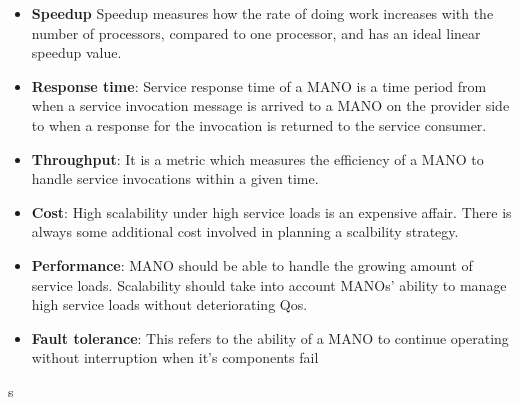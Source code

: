 \begin{itemize}
	\item \textbf{Speedup} Speedup measures how the  rate of doing work increases with the number of processors, compared to one processor, and has an ideal linear speedup value. \cite{jogalekar_evaluating_2000}
	\item  \textbf{Response time}: Service response time of a MANO is a time period from when a service invocation message is arrived to a MANO on the provider side to when a response for the invocation is returned to the service consumer.
	\item \textbf {Throughput}: It is a metric which measures the efficiency of a MANO to handle service invocations within a given time.
	\item \textbf{Cost}: High scalability under high service loads is an expensive affair. There is always some additional cost involved in planning a scalbility strategy.
	\item \textbf{Performance}: MANO should be able to handle the growing amount of service loads. Scalability should take into account MANOs' ability to manage high service loads without deteriorating Qos.
	\item \textbf{Fault tolerance}: This refers to the ability of a MANO to continue operating without interruption when it's components fail
\end{itemize}s